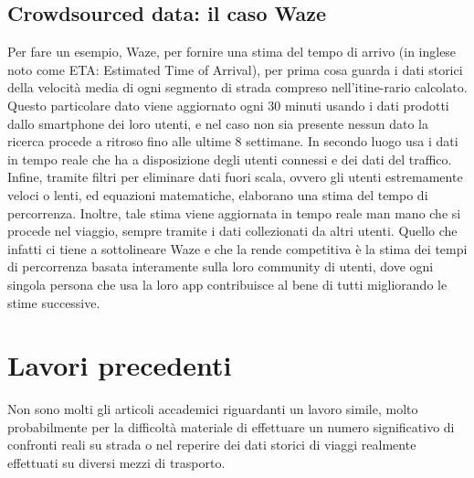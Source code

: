 \subsection{Crowdsourced data: il caso Waze}

Per fare un esempio, Waze, per fornire una stima del tempo di arrivo (in inglese noto come ETA: Estimated Time of Arrival), per prima cosa guarda i dati storici della velocità media di ogni segmento di strada compreso nell'itine-rario calcolato. Questo particolare dato viene aggiornato ogni 30 minuti usando i dati prodotti dallo smartphone dei loro utenti, e nel caso non sia presente nessun dato la ricerca procede a ritroso fino alle ultime 8 settimane. In secondo luogo usa i dati in tempo reale che ha a disposizione degli utenti connessi e dei dati del traffico. Infine, tramite filtri per eliminare dati fuori scala, ovvero gli utenti estremamente veloci o lenti, ed equazioni matematiche, elaborano una stima del tempo di percorrenza. Inoltre, tale stima viene aggiornata in tempo reale man mano che si procede nel viaggio, sempre tramite i dati collezionati da altri utenti. Quello che infatti ci tiene a sottolineare Waze e che la rende competitiva è la stima dei tempi di percorrenza basata interamente sulla loro community di utenti, dove ogni singola persona che usa la loro app contribuisce al bene di tutti migliorando le stime successive\cite{wazeblog}.

\section{Lavori precedenti}

Non sono molti gli articoli accademici riguardanti un lavoro simile, molto probabilmente per la difficoltà materiale di effettuare un numero significativo di confronti reali su strada o nel reperire dei dati storici di viaggi realmente effettuati su diversi mezzi di trasporto.

